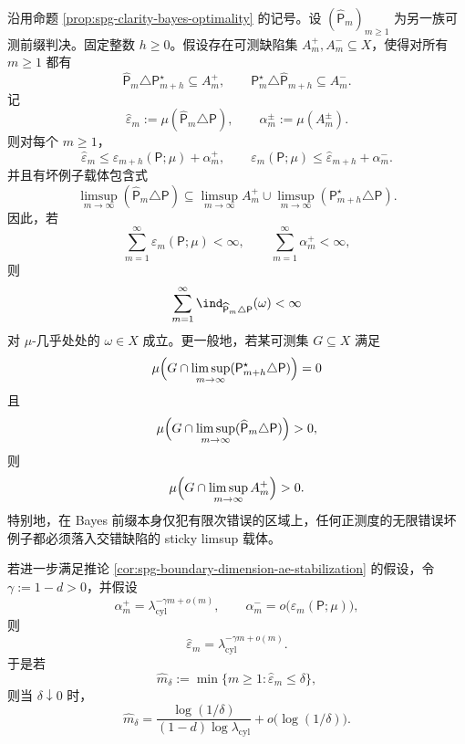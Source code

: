 \begin{theorem}\label{distill:persistent_homology_persistence_modules_and_constructible_sheaf_persistence-stability_and_interleaving-spg-bayes-prefix-summable-interleaving-defect-transfer}
沿用命题 \ref{prop:spg-clarity-bayes-optimality} 的记号。设 \((\widehat{\mathsf P}_m)_{m\ge 1}\) 为另一族可测前缀判决。固定整数 \(h\ge 0\)。假设存在可测缺陷集 \(A_m^+,A_m^-\subseteq X\)，使得对所有 \(m\ge 1\) 都有
\[
\widehat{\mathsf P}_m\triangle \mathsf P_{m+h}^\star\subseteq A_m^+,
\qquad
\mathsf P_m^\star\triangle \widehat{\mathsf P}_{m+h}\subseteq A_m^-.
\]
记
\[
\widehat\varepsilon_m:=\mu(\widehat{\mathsf P}_m\triangle \mathsf P),
\qquad
\alpha_m^\pm:=\mu(A_m^\pm).
\]
则对每个 \(m\ge 1\)，
\[
\widehat\varepsilon_m\le \varepsilon_{m+h}(\mathsf P;\mu)+\alpha_m^+,
\qquad
\varepsilon_m(\mathsf P;\mu)\le \widehat\varepsilon_{m+h}+\alpha_m^-.
\]
并且有坏例子载体包含式
\[
\limsup_{m\to\infty}(\widehat{\mathsf P}_m\triangle\mathsf P)
\subseteq
\limsup_{m\to\infty} A_m^+
\cup
\limsup_{m\to\infty}(\mathsf P_{m+h}^\star\triangle\mathsf P).
\]
因此，若
\[
\sum_{m=1}^\infty \varepsilon_m(\mathsf P;\mu)<\infty,
\qquad
\sum_{m=1}^\infty \alpha_m^+<\infty,
\]
则
\[
\sum_{m=1}^\infty \ind_{\widehat{\mathsf P}_m\triangle\mathsf P}(\omega)<\infty
\]
对 \(\mu\)-几乎处处的 \(\omega\in X\) 成立。更一般地，若某可测集 \(G\subseteq X\) 满足
\[
\mu\Bigl(G\cap\limsup_{m\to\infty}(\mathsf P_{m+h}^\star\triangle\mathsf P)\Bigr)=0
\]
且
\[
\mu\Bigl(G\cap\limsup_{m\to\infty}(\widehat{\mathsf P}_m\triangle\mathsf P)\Bigr)>0,
\]
则
\[
\mu\Bigl(G\cap\limsup_{m\to\infty}A_m^+\Bigr)>0.
\]
特别地，在 Bayes 前缀本身仅犯有限次错误的区域上，任何正测度的无限错误坏例子都必须落入交错缺陷的 sticky limsup 载体。

若进一步满足推论 \ref{cor:spg-boundary-dimension-ae-stabilization} 的假设，令 \(\gamma:=1-d>0\)，并假设
\[
\alpha_m^+=\lambda_{\mathrm{cyl}}^{-\gamma m+o(m)},
\qquad
\alpha_m^-=o\bigl(\varepsilon_m(\mathsf P;\mu)\bigr),
\]
则
\[
\widehat\varepsilon_m=\lambda_{\mathrm{cyl}}^{-\gamma m+o(m)}.
\]
于是若
\[
\widehat m_\delta:=\min\{m\ge 1:\widehat\varepsilon_m\le\delta\},
\]
则当 \(\delta\downarrow0\) 时，
\[
\widehat m_\delta
=
\frac{\log(1/\delta)}{(1-d)\log\lambda_{\mathrm{cyl}}}
+o\!\bigl(\log(1/\delta)\bigr).
\]
\end{theorem}
